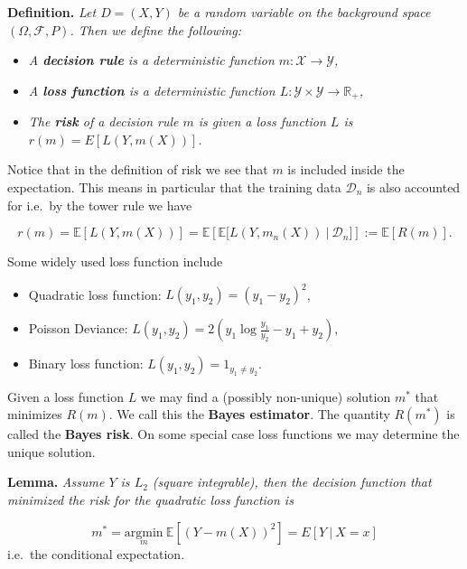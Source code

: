 \documentclass[a4paper,12pt,openany]{book}
\providecommand{\tightlist}{%
 \setlength{\itemsep}{0pt}\setlength{\parskip}{0pt}}
\begin{document}
\textbf{Definition.} \emph{Let \(D=(X,Y)\) be a random variable on the background space \((\Omega, \mathcal{F},P)\). Then we define the following:}

\begin{itemize}
\tightlist
\item
  \emph{A \textbf{decision rule} is a deterministic function \(m:\mathcal{X}\to \mathcal{Y}\),}
\item
  \emph{A \textbf{loss function} is a deterministic function \(L: \mathcal{Y}\times \mathcal{Y}\to \mathbb{R}_+\),}
\item
  \emph{The \textbf{risk} of a decision rule \(m\) is given a loss function \(L\) is \(r(m)=E[L(Y,m(X))]\).}
\end{itemize}

Notice that in the definition of risk we see that \(m\) is included inside the expectation. This means in particular that the training data \(\mathcal{D}_n\) is also accounted for i.e.~by the tower rule we have

\[
r(m)=\mathbb{E}[L(Y,m(X))]=\mathbb{E}\left[\mathbb{E}\Big[L(Y,m_n(X))\ \Big\vert\ \mathcal{D}_n\Big]\right]:=\mathbb{E}\left[R(m)\right].
\]

Some widely used loss function include

\begin{itemize}
\tightlist
\item
  Quadratic loss function: \(L(y_1,y_2)=(y_1-y_2)^2\),
\item
  Poisson Deviance: \(L(y_1,y_2)=2\left(y_1\log\frac{y_1}{y_2}-y_1+y_2\right)\),
\item
  Binary loss function: \(L(y_1,y_2)=1_{y_1\ne y_2}\).
\end{itemize}

Given a loss function \(L\) we may find a (possibly non-unique) solution \(m^*\) that minimizes \(R(m)\). We call this the \textbf{Bayes estimator}. The quantity \(R(m^*)\) is called the \textbf{Bayes risk}. On some special case loss functions we may determine the unique solution.

\textbf{Lemma.} \emph{Assume \(Y\) is \(L_2\) (square integrable), then the decision function that minimized the risk for the quadratic loss function is}

\[
m^*=\underset{m}{\text{argmin}}\ \mathbb{E}[(Y-m(X))^2]=E[Y\ \vert\ X=x]
\]
i.e.~the conditional expectation.
\end{document}
